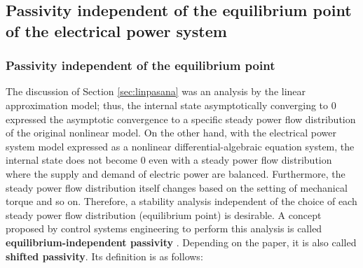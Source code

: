 \documentclass[tombow,dvipdfmx]{corona-a5-1.1}
\begin{document}
\subsection{Passivity independent of the equilibrium point of the electrical power system\advanced}

\smallskip
\subsubsection{Passivity independent of the equilibrium point}

The discussion of Section \ref{sec:linpasana} was an analysis by the linear approximation model; thus, the internal state asymptotically converging to 0 expressed the asymptotic convergence to a specific steady power flow distribution of the original nonlinear model.
On the other hand, with the electrical power system model expressed as a nonlinear differential-algebraic equation system, the internal state does not become 0 even with a steady power flow distribution where the supply and demand of electric power are balanced.
Furthermore, the steady power flow distribution itself changes based on the setting of mechanical torque and so on.
Therefore, a stability analysis independent of the choice of each steady power flow distribution (equilibrium point) is desirable. A concept proposed by control systems engineering to perform this analysis is called \textbf{equilibrium-independent passivity} \cite{hines2011equilibrium,simpson2019equilibrium}. Depending on the paper, it is also called \textbf{shifted passivity}. Its definition is as follows:
\end{document}

